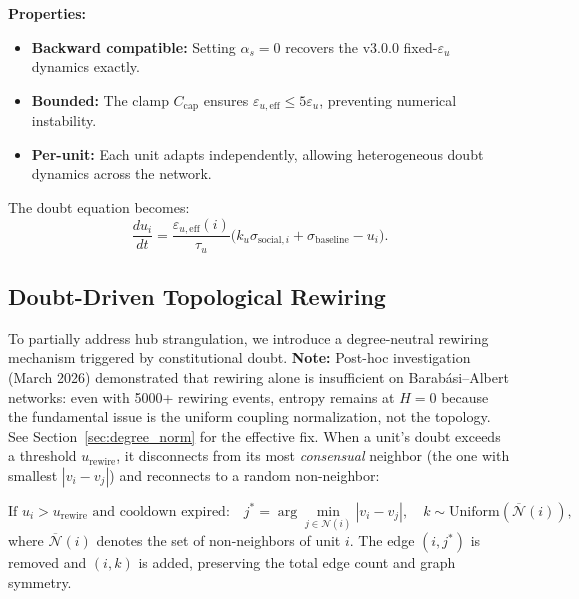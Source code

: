 \documentclass[11pt]{article}
\begin{document}
\textbf{Properties:}
\begin{itemize}
    \item \textbf{Backward compatible:} Setting $\alpha_s = 0$ recovers the v3.0.0 fixed-$\varepsilon_u$ dynamics exactly.
    \item \textbf{Bounded:} The clamp $C_{\text{cap}}$ ensures $\varepsilon_{u,\text{eff}} \leq 5\varepsilon_u$, preventing numerical instability.
    \item \textbf{Per-unit:} Each unit adapts independently, allowing heterogeneous doubt dynamics across the network.
\end{itemize}

The doubt equation becomes:
\begin{equation}
    \frac{du_i}{dt} = \frac{\varepsilon_{u,\text{eff}}(i)}{\tau_u}\bigl(k_u \sigma_{\text{social},i} + \sigma_{\text{baseline}} - u_i\bigr).
    \label{eq:du_adaptive}
\end{equation}

\subsection{Doubt-Driven Topological Rewiring}

To partially address hub strangulation, we introduce a degree-neutral rewiring mechanism triggered by constitutional doubt. \textbf{Note:} Post-hoc investigation (March 2026) demonstrated that rewiring alone is insufficient on Barab\'asi--Albert networks: even with 5000+ rewiring events, entropy remains at $H = 0$ because the fundamental issue is the uniform coupling normalization, not the topology. See Section~\ref{sec:degree_norm} for the effective fix. When a unit's doubt exceeds a threshold $u_{\text{rewire}}$, it disconnects from its most \emph{consensual} neighbor (the one with smallest $|v_i - v_j|$) and reconnects to a random non-neighbor:

\begin{equation}
    \text{If } u_i > u_{\text{rewire}} \text{ and cooldown expired:} \quad
    j^* = \arg\min_{j \in \mathcal{N}(i)} |v_i - v_j|, \quad
    k \sim \text{Uniform}(\overline{\mathcal{N}}(i)),
    \label{eq:rewire}
\end{equation}
where $\overline{\mathcal{N}}(i)$ denotes the set of non-neighbors of unit $i$. The edge $(i, j^*)$ is removed and $(i, k)$ is added, preserving the total edge count and graph symmetry.
\end{document}
